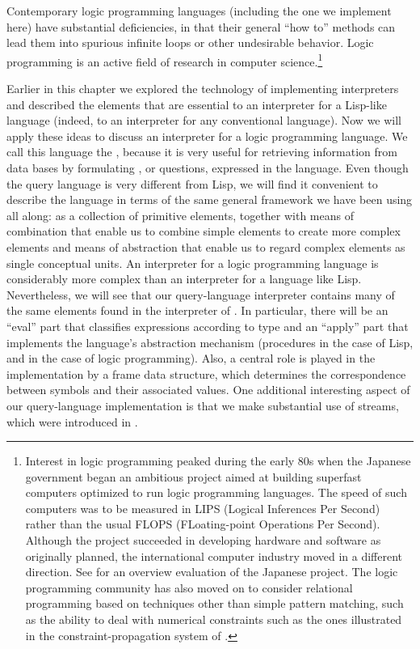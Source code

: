 Contemporary logic programming languages (including the one we implement here)
have substantial deficiencies, in that their general ``how to'' methods can
lead them into spurious infinite loops or other undesirable behavior.  Logic
programming is an active field of research in computer
science.\footnote{Interest in logic programming peaked during the early 80s
when the Japanese government began an ambitious project aimed at building
superfast computers optimized to run logic programming languages.  The speed of
such computers was to be measured in LIPS (Logical Inferences Per Second)
rather than the usual FLOPS (FLoating-point Operations Per Second).  Although
the project succeeded in developing hardware and software as originally
planned, the international computer industry moved in a different direction.
See  for an overview evaluation of the Japanese
project.  The logic programming community has also moved on to consider
relational programming based on techniques other than simple pattern matching,
such as the ability to deal with numerical constraints such as the ones
illustrated in the constraint-propagation system of .}

Earlier in this chapter we explored the technology of implementing interpreters
and described the elements that are essential to an interpreter for a Lisp-like
language (indeed, to an interpreter for any conventional language).  Now we
will apply these ideas to discuss an interpreter for a logic programming
language.  We call this language the , because it is
very useful for retrieving information from data bases by formulating
, or questions, expressed in the language.  Even though the
query language is very different from Lisp, we will find it convenient to
describe the language in terms of the same general framework we have been using
all along: as a collection of primitive elements, together with means of
combination that enable us to combine simple elements to create more complex
elements and means of abstraction that enable us to regard complex elements as
single conceptual units.  An interpreter for a logic programming language is
considerably more complex than an interpreter for a language like Lisp.
Nevertheless, we will see that our query-language interpreter contains many of
the same elements found in the interpreter of .  In
particular, there will be an ``eval'' part that classifies expressions
according to type and an ``apply'' part that implements the language's
abstraction mechanism (procedures in the case of Lisp, and  in
the case of logic programming).  Also, a central role is played in the
implementation by a frame data structure, which determines the correspondence
between symbols and their associated values.  One additional interesting aspect
of our query-language implementation is that we make substantial use of
streams, which were introduced in .



